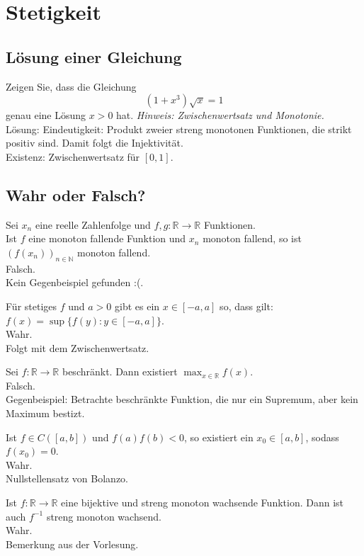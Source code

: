 \section{Stetigkeit}
\subsection{Lösung einer Gleichung}
Zeigen Sie, dass die Gleichung
\begin{displaymath}
  (1+x^3)\sqrt{x} = 1
\end{displaymath}
genau eine Lösung $x > 0$ hat. \textit{Hinweis: Zwischenwertsatz und Monotonie.}\\
Lösung: Eindeutigkeit: Produkt zweier streng monotonen Funktionen, die strikt positiv sind.
Damit folgt die Injektivität.\\
Existenz: Zwischenwertsatz für $[0,1]$.

\subsection{Wahr oder Falsch?}
Sei $x_n$ eine reelle Zahlenfolge und $f,g : \mathbb{R} \to \mathbb{R}$ Funktionen.\\
Ist $f$ eine monoton fallende Funktion und $x_n$ monoton fallend, so ist $(f(x_n))_{n \in \mathbb{N}}$ monoton fallend.\\
Falsch.\\
Kein Gegenbeispiel gefunden :(.

Für stetiges $f$ und $a > 0$ gibt es ein $x \in [-a,a]$ so, dass gilt: $f(x) = \sup\{f(y) : y \in [-a,a]\}$.\\
Wahr.\\
Folgt mit dem Zwischenwertsatz.

Sei $f : \mathbb{R} \to \mathbb{R}$ beschränkt.
Dann existiert $\max_{x \in \mathbb{R}} f(x)$.\\
Falsch.\\
Gegenbeispiel: Betrachte beschränkte Funktion, die nur ein Supremum, aber kein Maximum bestizt.

Ist $f \in C([a,b])$ und $f(a)f(b) < 0$, so existiert ein $x_0 \in [a,b]$, sodass $f(x_0) = 0$.\\
Wahr.\\
Nullstellensatz von Bolanzo.

Ist $f : \mathbb{R} \to \mathbb{R}$ eine bijektive und streng monoton wachsende Funktion.
Dann ist auch $f^{-1}$ streng monoton wachsend.\\
Wahr.\\
Bemerkung aus der Vorlesung.


